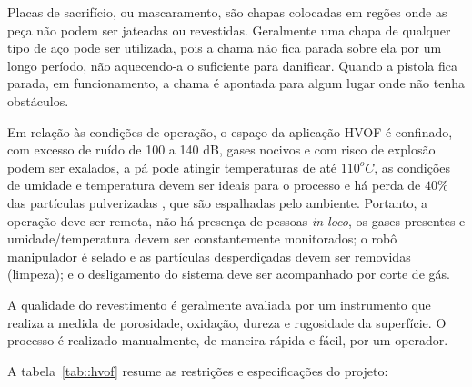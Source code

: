 Placas de sacrifício, ou mascaramento, são chapas colocadas em regões onde as
peça não podem ser jateadas ou revestidas. Geralmente uma chapa de qualquer tipo
de aço pode ser utilizada, pois a chama não fica parada sobre ela por um longo
período, não aquecendo-a o suficiente para danificar. Quando a pistola fica
parada, em funcionamento, a chama é apontada para algum lugar onde não tenha
obstáculos.

 

Em relação às condições de operação, o espaço da aplicação HVOF é confinado, com
excesso de ruído de 100 a 140 dB, gases nocivos e com risco de explosão podem
ser exalados, a pá pode atingir temperaturas de até $110^oC$, as condições de
umidade e temperatura devem ser ideais para o processo e há perda de $40\%$
das partículas pulverizadas  \citep{wu2006rebound}, que são espalhadas pelo
ambiente. Portanto, a operação deve ser remota, não há presença de pessoas \textit{in loco}, os gases
presentes e umidade/temperatura devem ser constantemente monitorados; o robô
manipulador é selado e as partículas desperdiçadas devem ser removidas
(limpeza); e o desligamento do sistema deve ser acompanhado por corte de gás.

A qualidade do revestimento é geralmente avaliada por um instrumento que
realiza a medida de porosidade, oxidação, dureza e rugosidade da superfície. O
processo é realizado manualmente, de maneira rápida e fácil, por um operador.

A tabela~\ref{tab::hvof} resume as restrições e especificações do
projeto:

